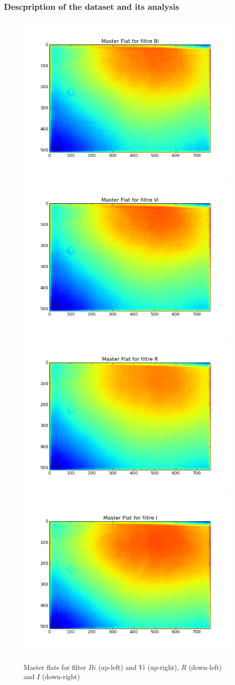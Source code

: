 \documentclass[\docopts]{\docclass}
\begin{document}
\subsubsection{Descpription of the dataset and its analysis}
\begin{figure}[ht]
  \centering
  \includegraphics[width=0.45\linewidth]{master_flat_Bi.png}
  \includegraphics[width=0.45\linewidth]{master_flat_Vi.png}
  \includegraphics[width=0.45\linewidth]{master_flat_R.png}
  \includegraphics[width=0.45\linewidth]{master_flat_I.png}
  \caption{Master flats for filter $Bi$ (up-left) and $Vi$ (up-right), $R$ (down-left) and $I$ (down-right)}
  \label{fig:master_flats}
\end{figure}
\end{document}
